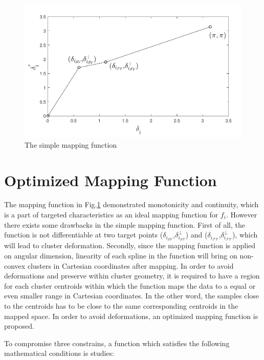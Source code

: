 \begin{figure}[thpb]
\centering
\includegraphics[scale=0.7]{Fig/simple_spline1.pdf}
\caption{The simple mapping function}
\label{fig:simple_spline}
\end{figure}

\section{Optimized Mapping Function}

The mapping function in Fig.\ref{fig:simple_spline} demonstrated monotonicity and continuity, which is a part of targeted characteristics as an ideal mapping function for $f_i$. However there exists some drawbacks in the simple mapping function. First of all, the function is not differentiable at two target points ($\delta_{i_{{\mathcal{SV}}}}$,$\delta^{\perp}_{i_{{\mathcal{SV}}}}$) and ($\delta_{i_{{\mathcal{FV}}}}$,$\delta^{\perp}_{i_{{\mathcal{FV}}}}$), which will lead to cluster deformation. Secondly, since the mapping function is applied on angular dimension, linearity of each spline in the function will bring on non-convex clusters in Cartesian coordinates after mapping. In order to avoid deformations and preserve within cluster geometry, it is required to have a region for each cluster centroids within which the function maps the data to a equal or even smaller range in Cartesian coordinates. In the other word, the samples close to the centroids has to be close to the same corresponding centroids in the mapped space. In order to avoid deformations, an optimized mapping function is proposed.

To compromise three constrains, a function which satisfies the following mathematical conditions is studies:

